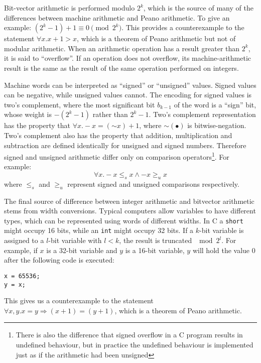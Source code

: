 \documentclass[preprint]{sigplanconf}
\theoremstyle{definition}
\begin{document}
Bit-vector arithmetic is performed modulo $2^k$, which is the source of many of the differences between
machine arithmetic and Peano arithmetic.  To give an example: $(2^k - 1) + 1 \equiv 0 \pmod {2^k}$.
This provides a counterexample to the statement $\forall x . x + 1 > x$, which is a theorem of Peano
arithmetic but not of modular arithmetic.  When an arithmetic operation has a result greater than $2^k$,
it is said to ``overflow''.  If an operation does not overflow, its machine-arithmetic result is the same
as the result of the same operation performed on integers.

Machine words can be interpreted as ``signed'' or ``unsigned'' values.  Signed values can be negative,
while unsigned values cannot.  The encoding for signed values is two's complement, where the most significant
bit $b_{k-1}$ of the word is a ``sign'' bit, whose weight is $-(2^k - 1)$ rather than $2^k - 1$.  Two's complement
representation has the property that $\forall x . -x = (\mathord{\sim} x) + 1$, where $\mathord{\sim}(\bullet)$
is bitwise-negation.  Two's complement also has the property that addition, multiplication and subtraction are defined
identically for unsigned and signed numbers.  Therefore signed and unsigned arithmetic differ only on comparison
operators\footnote{There is also the difference that signed overflow in a C program results in undefined behaviour,
but in practice the undefined behaviour is implemented just as if the arithmetic had been unsigned}.
For example: $$\forall x . -x \leq_s x \wedge -x \geq_u x$$ where $\leq_s$ and $\geq_u$ represent signed and unsigned comparisons respectively.

The final source of difference between integer arithmetic and bitvector arithmetic stems from width conversions.
Typical computers allow variables to have different types, which can be represented using words of different widths.
In C a \texttt{short} might occupy
16 bits, while an \texttt{int} might occupy 32 bits.  If a $k$-bit variable is assigned to a $l$-bit variable
with $l < k$, the result is truncated $\mod 2^l$.  For example, if $x$ is a 32-bit variable and $y$ is a 16-bit
variable, $y$ will hold the value $0$ after the following code is executed:

\begin{lstlisting}
x = 65536;
y = x;
\end{lstlisting}

This gives us a counterexample to the statement $\forall x, y . x = y \Rightarrow (x + 1) = (y + 1)$,
which is a theorem of Peano arithmetic.
\end{document}
